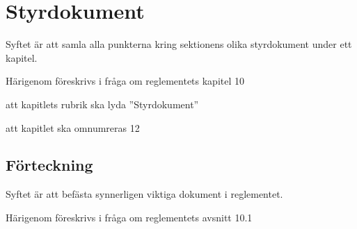 \documentclass{article}
\begin{document}
\section{Styrdokument}
Syftet är att samla alla punkterna kring sektionens olika styrdokument under ett kapitel.

Härigenom föreskrivs i fråga om reglementets kapitel 10

\begin{dels}
    \item att kapitlets rubrik ska lyda ''Styrdokument''
    \item att kapitlet ska omnumreras 12
\end{dels}

\subsection{Förteckning}
Syftet är att befästa synnerligen viktiga dokument i reglementet. 

Härigenom föreskrivs i fråga om reglementets avsnitt 10.1
\end{document}
